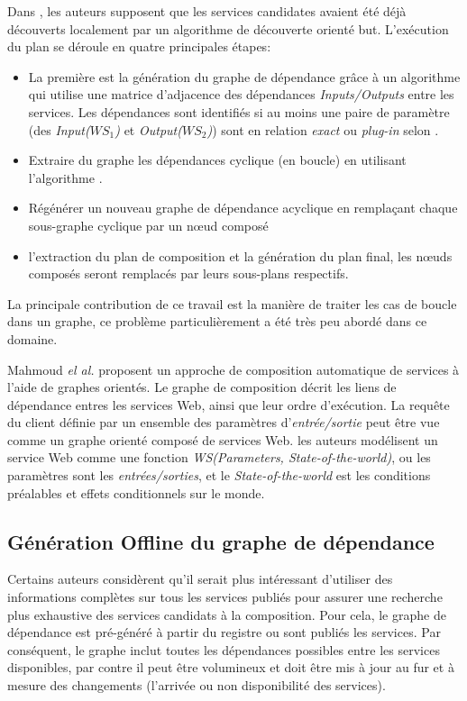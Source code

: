   Dans \cite{omer2009dependency}, les auteurs supposent que les
  services candidates avaient été déjà découverts localement par un
  algorithme de découverte orienté but. L'exécution du plan se déroule
  en quatre principales étapes:

  \SpecialItem
  \begin{itemize}
  \item La première est la génération du graphe de dépendance grâce à
    un algorithme qui utilise une matrice d'adjacence des dépendances
    \textit{Inputs/Outputs} entre les services. Les dépendances sont
    identifiés si au moins une paire de paramètre (des
    \textit{Input($WS_1$)} et \textit{Output($WS_2$)}) sont en
    relation \textit{exact} ou \textit{plug-in} selon
    \cite{paolucci2002semantic}.

  \item Extraire du graphe les dépendances cyclique (en boucle) en
    utilisant l'algorithme \cite{tarjan1973enumeration}.

  \item Régénérer un nouveau graphe de dépendance acyclique en
    remplaçant chaque sous-graphe cyclique par un nœud composé

  \item l'extraction du plan de composition et la génération du plan
    final, les nœuds composés seront remplacés par leurs sous-plans
    respectifs.\medskip
  \end{itemize}
  \enddescription

  La principale contribution de ce travail est la manière de traiter
  les cas de boucle dans un graphe, ce problème particulièrement a été
  très peu abordé dans ce domaine.\bigskip

  Mahmoud \emph{el al.} \cite{mahmoud2013towards} proposent un
  approche de composition automatique de services à l'aide de graphes
  orientés. Le graphe de composition décrit les liens de dépendance
  entres les services Web, ainsi que leur ordre d'exécution. La requête
  du client définie par un ensemble des paramètres
  d'\textit{entrée/sortie} peut être vue comme un graphe orienté
  composé de services Web. les auteurs modélisent un service Web comme
  une fonction \textit{WS(Parameters, State-of-the-world)}, ou les
  paramètres sont les \textit{entrées/sorties}, et le
  \textit{State-of-the-world} est les conditions préalables et effets
  conditionnels sur le monde.

  \subsection{Génération Offline du graphe de dépendance}
  \label{sec:generation-offline}
  Certains auteurs considèrent qu'il serait plus intéressant
  d'utiliser des informations complètes sur tous les services publiés
  pour assurer une recherche plus exhaustive des services candidats à
  la composition. Pour cela, le graphe de dépendance est pré-généré à
  partir du registre ou sont publiés les services. Par conséquent, le
  graphe inclut toutes les dépendances possibles entre les services
  disponibles, par contre il peut être volumineux et doit être mis à
  jour au fur et à mesure des changements (l'arrivée ou non
  disponibilité des services).\bigskip

